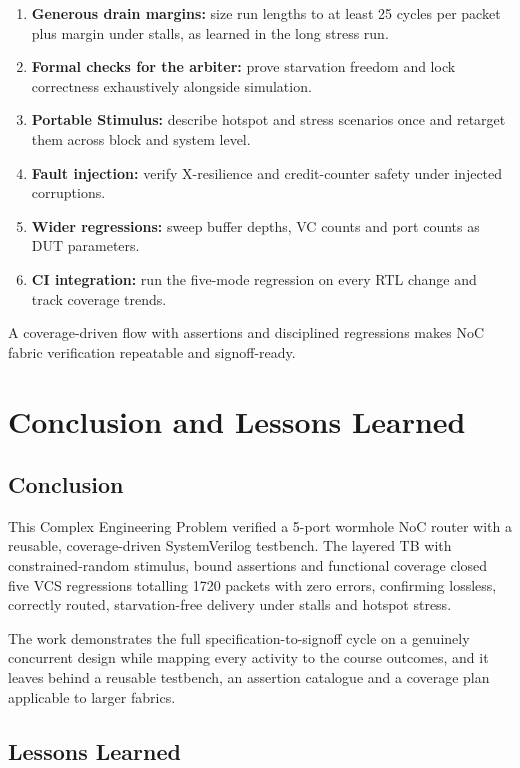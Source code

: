 \documentclass[11pt,a4paper]{report}  %
\begin{document}
\begin{enumerate}
    \item \textbf{Generous drain margins:} size run lengths to at least 25 cycles per packet plus margin under stalls, as learned in the long stress run.
    \item \textbf{Formal checks for the arbiter:} prove starvation freedom and lock correctness exhaustively alongside simulation.
    \item \textbf{Portable Stimulus:} describe hotspot and stress scenarios once and retarget them across block and system level.
    \item \textbf{Fault injection:} verify X-resilience and credit-counter safety under injected corruptions.
    \item \textbf{Wider regressions:} sweep buffer depths, VC counts and port counts as DUT parameters.
    \item \textbf{CI integration:} run the five-mode regression on every RTL change and track coverage trends.
\end{enumerate}

A coverage-driven flow with assertions and disciplined regressions makes NoC
fabric verification repeatable and signoff-ready.

\section{Conclusion and Lessons Learned}

\subsection{Conclusion}

This Complex Engineering Problem verified a 5-port wormhole NoC router with a
reusable, coverage-driven SystemVerilog testbench. The layered TB with
constrained-random stimulus, bound assertions and functional coverage closed
five VCS regressions totalling 1720 packets with zero errors, confirming
lossless, correctly routed, starvation-free delivery under stalls and hotspot
stress.

The work demonstrates the full specification-to-signoff cycle on a genuinely
concurrent design while mapping every activity to the course outcomes, and it
leaves behind a reusable testbench, an assertion catalogue and a coverage plan
applicable to larger fabrics.

\subsection{Lessons Learned}
\end{document}
